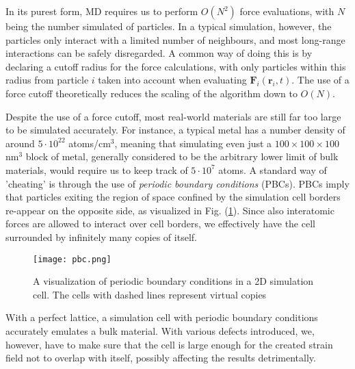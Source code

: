 In its purest form, MD requires us to perform $O(N^2)$ force evaluations, with $N$ being the number simulated of particles. 
In a typical simulation, however, the particles only interact with a limited number of neighbours, and most long-range interactions can be safely disregarded. 
A common way of doing this is by declaring a cutoff radius for the force calculations, with only particles within this radius from particle $i$ taken into account when evaluating $\mathbf{F}_i(\mathbf{r}_i,t)$. 
The use of a force cutoff theoretically reduces the scaling of the algorithm down to $O(N)$. \cite{verlet1967computer}

Despite the use of a force cutoff, most real-world materials are still far too large to be simulated accurately.
For instance, a typical metal has a number density of around $5\cdot 10^{22}$ atoms/cm$^3$, meaning that simulating even just a $100\times 100 \times 100$ nm$^3$ block of metal, generally considered to be the arbitrary lower limit of bulk materials, would require us to keep track of $5\cdot 10^7$ atoms.
A standard way of 'cheating' is through the use of \textit{periodic boundary conditions} (PBCs). 
PBCs imply that particles exiting the region of space confined by the simulation cell borders re-appear on the opposite side, as visualized in Fig. (\ref{Fig:pbcs}). 
Since also interatomic forces are allowed to interact over cell borders, we effectively have the cell surrounded by infinitely many copies of itself.

\begin{figure}[!ht]
\center
\texttt{[image: pbc.png]}
\caption{A visualization of periodic boundary conditions in a 2D simulation cell. The cells with dashed lines represent virtual copies}
\label{Fig:pbcs}
\end{figure}

With a perfect lattice, a simulation cell with periodic boundary conditions accurately emulates a bulk material. 
With various defects introduced, we, however, have to make sure that the cell is large enough for the created strain field not to overlap with itself, possibly affecting the results detrimentally.

